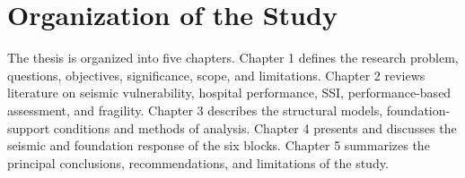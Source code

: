 \section{Organization of the Study}
The thesis is organized into five chapters. Chapter 1 defines the research problem, questions, objectives, significance, scope, and limitations. Chapter 2 reviews literature on seismic vulnerability, hospital performance, SSI, performance-based assessment, and fragility. Chapter 3 describes the structural models, foundation-support conditions and methods of analysis. Chapter 4 presents and discusses the seismic and foundation response of the six blocks. Chapter 5 summarizes the principal conclusions, recommendations, and limitations of the study.
